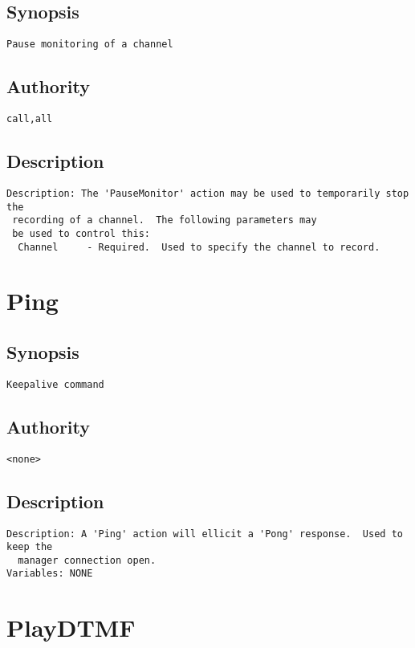 \subsection{Synopsis}
\begin{verbatim}
Pause monitoring of a channel
\end{verbatim}
\subsection{Authority}
\begin{verbatim}
call,all
\end{verbatim}
\subsection{Description}
\begin{verbatim}
Description: The 'PauseMonitor' action may be used to temporarily stop the
 recording of a channel.  The following parameters may
 be used to control this:
  Channel     - Required.  Used to specify the channel to record.

\end{verbatim}


\section{Ping}
\subsection{Synopsis}
\begin{verbatim}
Keepalive command
\end{verbatim}
\subsection{Authority}
\begin{verbatim}
<none>
\end{verbatim}
\subsection{Description}
\begin{verbatim}
Description: A 'Ping' action will ellicit a 'Pong' response.  Used to keep the
  manager connection open.
Variables: NONE

\end{verbatim}


\section{PlayDTMF}

